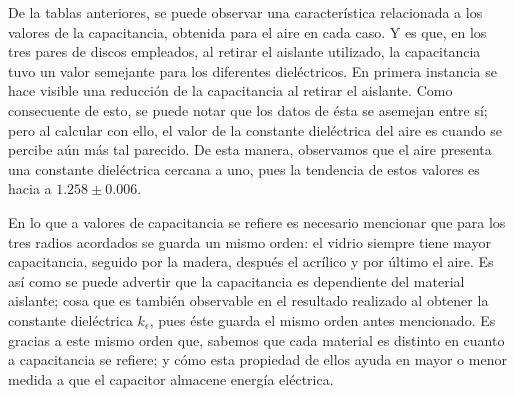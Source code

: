 \documentclass[letterpaper, 11 pt]{article}
\begin{document}
\begin{multicols}{2}






\begin{table}[H]
\begin{center}
\end{center}
\caption{Datos presentados para 
\textbf{Radio: $(9.850 \pm 0.002) cm$}}
\label{Tabla 1}
\end{table}

De la tablas anteriores, se puede observar una característica relacionada a los valores de la capacitancia, obtenida para el aire en cada caso. Y es que, en los tres pares de discos empleados, al retirar el aislante utilizado, la capacitancia tuvo un valor semejante para los diferentes dieléctricos. En primera instancia se hace visible una reducción de la capacitancia al retirar el aislante. Como consecuente de esto, se puede notar que los datos de ésta se asemejan entre sí; pero al calcular con ello, el valor de la constante dieléctrica del aire es cuando se percibe aún más tal parecido. De esta manera, observamos que el aire presenta una constante dieléctrica cercana a uno, pues la tendencia de estos valores es hacia a $1.258\pm0.006$.

En lo que a valores de capacitancia se refiere es necesario mencionar que para los tres radios acordados se guarda un mismo orden: el vidrio siempre tiene mayor capacitancia, seguido por la madera, después el acrílico y por último el aire. Es así como se puede advertir que la capacitancia es dependiente del material aislante; cosa que es también observable en el resultado realizado al obtener la constante dieléctrica $k_\epsilon$, pues éste guarda el mismo orden antes mencionado. Es gracias a este mismo orden que, sabemos que cada material es distinto en cuanto a capacitancia se refiere; y cómo esta propiedad de ellos ayuda en mayor o menor medida a que el capacitor almacene energía eléctrica.


\end{multicols}
\end{document}
